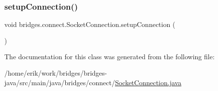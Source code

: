 \mbox{\label{classbridges_1_1connect_1_1_socket_connection_ac5467b4da6cd41b0cee00be5b4cbc60d}} 
\subsubsection{\texorpdfstring{setup\+Connection()}{setupConnection()}}
{\footnotesize\ttfamily void bridges.\+connect.\+Socket\+Connection.\+setup\+Connection (\begin{DoxyParamCaption}{ }\end{DoxyParamCaption})}



The documentation for this class was generated from the following file\+:\begin{DoxyCompactItemize}
\item 
/home/erik/work/bridges/bridges-\/java/src/main/java/bridges/connect/\hyperlink{_socket_connection_8java}{Socket\+Connection.\+java}\end{DoxyCompactItemize}
